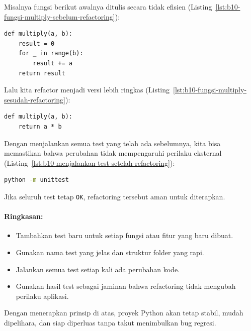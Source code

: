 Misalnya fungsi berikut awalnya ditulis secara tidak efisien (Listing~\ref{lst:b10-fungsi-multiply-sebelum-refactoring}):

\begin{lstlisting}[style=PythonStyle, caption={Fungsi multiply sebelum refactoring}, label={lst:b10-fungsi-multiply-sebelum-refactoring}]
def multiply(a, b):
    result = 0
    for _ in range(b):
        result += a
    return result
\end{lstlisting}

Lalu kita refactor menjadi versi lebih ringkas (Listing~\ref{lst:b10-fungsi-multiply-sesudah-refactoring}):

\begin{lstlisting}[style=PythonStyle, caption={Fungsi multiply sesudah refactoring}, label={lst:b10-fungsi-multiply-sesudah-refactoring}]
def multiply(a, b):
    return a * b
\end{lstlisting}

Dengan menjalankan semua test yang telah ada sebelumnya, kita bisa memastikan bahwa perubahan tidak mempengaruhi perilaku eksternal (Listing~\ref{lst:b10-menjalankan-test-setelah-refactoring}):

\begin{lstlisting}[language=bash, caption={Menjalankan test setelah refactoring}, label={lst:b10-menjalankan-test-setelah-refactoring}]
python -m unittest
\end{lstlisting}

Jika seluruh test tetap \texttt{OK}, refactoring tersebut aman untuk diterapkan.

\paragraph{Ringkasan:}
\begin{itemize}
    \item Tambahkan test baru untuk setiap fungsi atau fitur yang baru dibuat.
    \item Gunakan nama test yang jelas dan struktur folder yang rapi.
    \item Jalankan semua test setiap kali ada perubahan kode.
    \item Gunakan hasil test sebagai jaminan bahwa refactoring tidak mengubah perilaku aplikasi.
\end{itemize}

Dengan menerapkan prinsip di atas, proyek Python akan tetap stabil, mudah dipelihara, dan siap diperluas tanpa takut menimbulkan bug regresi.



